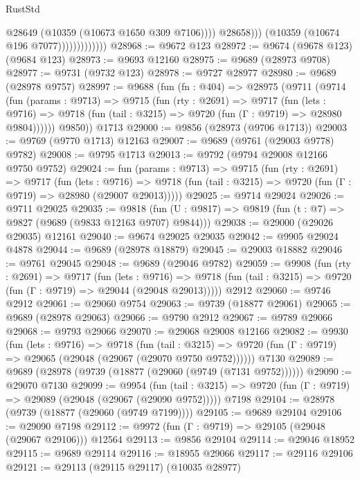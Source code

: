\begin{lexlean}{RustStd}
\begin{coremodule}
                                    @28649
                                    (@10359 (@10673 @1650 @309 @7106))))
                                @28658)))
                          (@10359 (@10674 @196 @7077)))))))))))))
@28968 := @9672 @123
@28972 := @9674 (@9678 @123) (@9684 @123)
@28973 := @9693 @12160
@28975 := @9689 (@28973 @9708)
@28977 := @9731 (@9732 @123)
@28978 := @9727 @28977
@28980 := @9689 (@28978 @9757)
@28997 := @9688
    (fun (fn : @404) =>
    @28975
      (@9711
        (@9714
          (fun (params : @9713) =>
          @9715
            (fun (rty : @2691) =>
            @9717
              (fun (lets : @9716) =>
              @9718 (fun (tail : @3215) => @9720 (fun (Γ : @9719) => @28980 @9804))))))
        @9850))
    @1713
@29000 := @9856 (@28973 (@9706 @1713))
@29003 := @9769 (@9770 @1713) @12163
@29007 := @9689 (@9761 (@29003 @9778) @9782)
@29008 := @9795 @1713
@29013 := @9792 (@9794 @29008 @12166 @9750 @9752)
@29024 := fun (params : @9713) =>
  @9715
    (fun (rty : @2691) =>
    @9717
      (fun (lets : @9716) =>
      @9718 (fun (tail : @3215) => @9720 (fun (Γ : @9719) => @28980 (@29007 @29013)))))
@29025 := @9714 @29024
@29026 := @9711 @29025
@29035 := @9818
    (fun (U : @9817) => @9819 (fun (t : @7) => @9827 (@9689 (@9833 @12163 @9707) @9844)))
@29038 := @29000 (@29026 @29035) @12161
@29040 := @9674 @29025 @29035
@29042 := @9905 @29024 @4878
@29044 := @9689 (@28978 @18879)
@29045 := @29003 @18882
@29046 := @9761 @29045
@29048 := @9689 (@29046 @9782)
@29059 := @9908
    (fun (rty : @2691) =>
    @9717
      (fun (lets : @9716) =>
      @9718 (fun (tail : @3215) => @9720 (fun (Γ : @9719) => @29044 (@29048 @29013)))))
    @2912
@29060 := @9746 @2912
@29061 := @29060 @9754
@29063 := @9739 (@18877 @29061)
@29065 := @9689 (@28978 @29063)
@29066 := @9790 @2912
@29067 := @9789 @29066
@29068 := @9793 @29066
@29070 := @29068 @29008 @12166
@29082 := @9930
    (fun (lets : @9716) =>
    @9718
      (fun (tail : @3215) =>
      @9720 (fun (Γ : @9719) => @29065 (@29048 (@29067 (@29070 @9750 @9752))))))
    @7130
@29089 := @9689 (@28978 (@9739 (@18877 (@29060 (@9749 (@7131 @9752))))))
@29090 := @29070 @7130
@29099 := @9954
    (fun (tail : @3215) => @9720 (fun (Γ : @9719) => @29089 (@29048 (@29067 (@29090 @9752)))))
    @7198
@29104 := @28978 (@9739 (@18877 (@29060 (@9749 @7199))))
@29105 := @9689 @29104
@29106 := @29090 @7198
@29112 := @9972 (fun (Γ : @9719) => @29105 (@29048 (@29067 @29106))) @12564
@29113 := @9856 @29104
@29114 := @29046 @18952
@29115 := @9689 @29114
@29116 := @18955 @29066
@29117 := @29116 @29106
@29121 := @29113 (@29115 @29117) (@10035 @28977)

\end{coremodule}
\end{lexlean}
